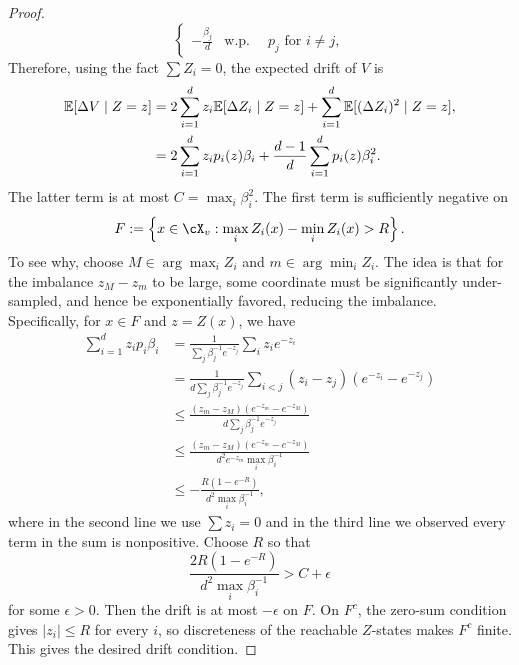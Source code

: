 \begin{subappendices}
\begin{proof}
\[\begin{cases}
            -\frac{\beta_j}{d} & \mathrm{w.p.} \quad \; p_j \text{ for } i \neq j,
        \end{cases}\]
        \noindent Therefore, using the fact $\sum Z_i = 0$, the expected drift of $V$ is
        \begin{align*}
            \mathbb{E}[\Delta V\mid Z=z] & =2\sum_{i=1}^d z_i\mathbb{E}[\Delta Z_i\mid Z=z] +\sum_{i=1}^d\mathbb{E}[(\Delta Z_i)^2\mid Z=z], \\
            & =2\sum_{i=1}^d z_i p_i(z)\beta_i +\frac{d-1}{d}\sum_{i=1}^d p_i(z)\beta_i^2.
        \end{align*}
        \noindent The latter term is at most $C = \max_i \beta_i^2$. The first term is sufficiently negative on
        \[F := \left\{x \in \cX_v : \max_i Z_i(x) - \min_i Z_i(x) > R\right\}.\]
        \noindent To see why, choose $M \in \arg\max_i Z_i$ and $m \in \arg\min_i Z_i$. The idea is that for
        the imbalance $z_M - z_m$ to be large, some coordinate must be significantly under-sampled, and hence
        be exponentially favored, reducing the imbalance. Specifically, for $x \in F$ and $z=Z(x)$, we have
        \begin{align*}
            \sum_{i=1}^d z_i p_i\beta_i & = \frac{1}{\sum_j \beta_j^{-1} e^{-z_j}} \sum_{i} z_i e^{-z_i}\\
            & = \frac{1}{d \sum_j \beta_j^{-1} e^{-z_j}} \sum_{i < j} (z_i - z_j)(e^{-z_i} -  e^{-z_j})\\
            & \leq \frac{(z_m - z_M)(e^{-z_m} -  e^{-z_M})}{d \sum_j \beta_j^{-1} e^{-z_j}} \\
            & \leq \frac{(z_m - z_M)(e^{-z_m} -  e^{-z_M})}{d^2 e^{-z_m} \max_i \beta_i^{-1}} \\
            & \leq - \frac{R(1-e^{-R})}{d^2 \max_i \beta_i^{-1}},
        \end{align*}
        \noindent where in the second line we use $\sum z_i = 0$ and in the third line we observed
        every term in the sum is nonpositive. Choose $R$ so that
        \[\frac{2R(1-e^{-R})}{d^2\max_i\beta_i^{-1}}>C+\epsilon\]
        for some $\epsilon>0$. Then the drift is at most $-\epsilon$ on $F$. On $F^c$, the zero-sum condition gives
         $|z_i|\leq R$ for every $i$, so discreteness of the reachable $Z$-states makes $F^c$ finite. This gives the desired drift
         condition.
    \end{proof}







\end{subappendices}
